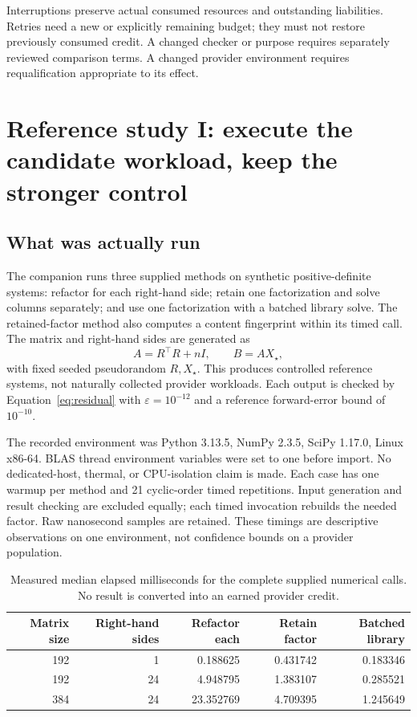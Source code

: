 \documentclass[11pt,letterpaper]{article}
\theoremstyle{remark}\newtheorem{remark}{Remark}[section]
\begin{document}
Interruptions preserve actual consumed resources and outstanding liabilities. Retries need a new or explicitly remaining budget; they must not restore previously consumed credit. A changed checker or purpose requires separately reviewed comparison terms. A changed provider environment requires requalification appropriate to its effect.

\section{Reference study I: execute the candidate workload, keep the stronger control}
\label{sec:numeric}
\subsection{What was actually run}
The companion runs three supplied methods on synthetic positive-definite systems: refactor for each right-hand side; retain one factorization and solve columns separately; and use one factorization with a batched library solve. The retained-factor method also computes a content fingerprint within its timed call. The matrix and right-hand sides are generated as
\begin{equation}
A=R^\top R+nI,\qquad B=AX_\star,
\end{equation}
with fixed seeded pseudorandom $R,X_\star$. This produces controlled reference systems, not naturally collected provider workloads. Each output is checked by Equation~\eqref{eq:residual} with $\varepsilon=10^{-12}$ and a reference forward-error bound of $10^{-10}$.

The recorded environment was Python 3.13.5, NumPy 2.3.5, SciPy 1.17.0, Linux x86-64. BLAS thread environment variables were set to one before import. No dedicated-host, thermal, or CPU-isolation claim is made. Each case has one warmup per method and 21 cyclic-order timed repetitions. Input generation and result checking are excluded equally; each timed invocation rebuilds the needed factor. Raw nanosecond samples are retained. These timings are descriptive observations on one environment, not confidence bounds on a provider population.

\begin{table}[htbp]\centering\small
\caption{Measured median elapsed milliseconds for the complete supplied numerical calls. No result is converted into an earned provider credit.}\label{tab:numeric}
\begin{tabular}{@{}rrrrr@{}}\toprule
Matrix size & Right-hand sides & Refactor each & Retain factor & Batched library\\\midrule
192 & 1 & 0.188625 & 0.431742 & 0.183346\\
192 & 24 & 4.948795 & 1.383107 & 0.285521\\
384 & 24 & 23.352769 & 4.709395 & 1.245649\\\bottomrule
\end{tabular}
\end{table}
\end{document}

